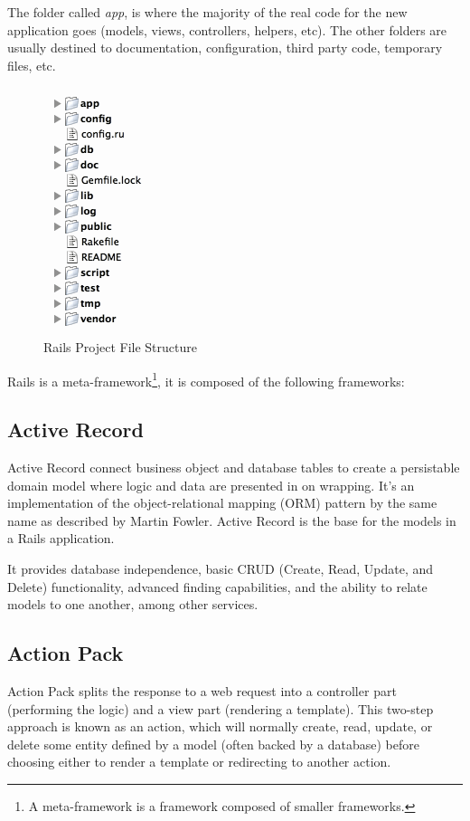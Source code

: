 The folder called \emph{app}, 
is where the majority of the real code for the new application goes (models, views, controllers, helpers, etc).
The other folders are usually destined to documentation, configuration, third party code, temporary files, etc.

\begin{figure}[h!]
  \caption{Rails Project File Structure}\label{fig:rails_file_structure}
  \centering
  \includegraphics[scale=0.75]{Images/rails_files}
\end{figure}

Rails is a \textsf{meta-framework}\footnote{
  A meta-framework is a framework composed of smaller frameworks.
}, it is composed of the following frameworks:


\subsection{Active Record}
Active Record connect business object and database tables to create a persistable domain model where logic and data are presented in on wrapping. It’s an implementation of the object-relational mapping (ORM) pattern by the same name as described by Martin Fowler.
Active Record is the base for the models in a Rails application.

It provides database independence, basic CRUD (Create, Read, Update, and Delete) functionality, advanced finding capabilities, and the ability to relate models to one another, among other services.


\subsection{Action Pack} 
Action Pack splits the response to a web request into a controller part (performing the logic) and a view part (rendering a template). This two-step approach is known as an action, which will normally create, read, update, 
or delete some entity defined by a model (often backed by a database) 
before choosing either to render a template or redirecting to another action.

